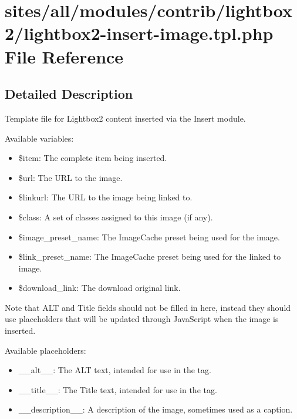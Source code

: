 \hypertarget{lightbox2-insert-image_8tpl_8php}{
\section{sites/all/modules/contrib/lightbox2/lightbox2-insert-image.tpl.php File Reference}
\label{lightbox2-insert-image_8tpl_8php}
}


\subsection{Detailed Description}
Template file for Lightbox2 content inserted via the Insert module.

Available variables:\begin{itemize}
\item \$item: The complete item being inserted.\item \$url: The URL to the image.\item \$linkurl: The URL to the image being linked to.\item \$class: A set of classes assigned to this image (if any).\item \$image\_\-preset\_\-name: The ImageCache preset being used for the image.\item \$link\_\-preset\_\-name: The ImageCache preset being used for the linked to image.\item \$download\_\-link: The download original link.\end{itemize}


Note that ALT and Title fields should not be filled in here, instead they should use placeholders that will be updated through JavaScript when the image is inserted.

Available placeholders:\begin{itemize}
\item \_\-\_\-alt\_\-\_\-: The ALT text, intended for use in the  tag.\item \_\-\_\-title\_\-\_\-: The Title text, intended for use in the  tag.\item \_\-\_\-description\_\-\_\-: A description of the image, sometimes used as a caption. \end{itemize}
